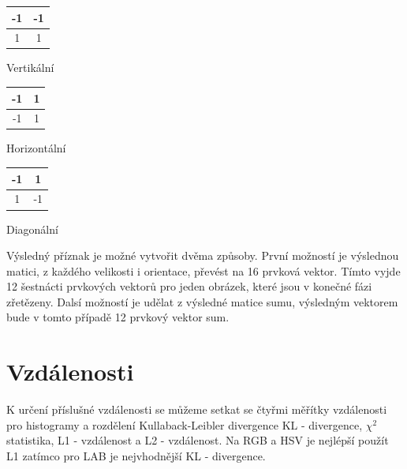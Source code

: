 \documentclass[czech,BP]{thesiskiv}
\begin{document}

\begin{multicols}{3}
	\begin{center}
		\begin{tabular}{ | c | c | }
    		\hline
    		\cellcolor{ashgrey!50}-1 & \cellcolor{ashgrey!50}-1 \\ \hline
    		1 & 1 \\ 
    		\hline
    	\end{tabular}
    	\vspace{0.5cm}
    	\par Vertikální
	\end{center}
	\begin{center}
		\begin{tabular}{ | c | c | }
    		\hline
    		\cellcolor{ashgrey!50}-1 & 1 \\ \hline
    		\cellcolor{ashgrey!50}-1 & 1 \\ 
    		\hline
    	\end{tabular}
		\vspace{0.5cm}
    	\par Horizontální
	\end{center} 	
	\begin{center}
		\begin{tabular}{ | c | c | }
    		\hline
    		\cellcolor{ashgrey!50}-1 & 1 \\ \hline
    		1 & \cellcolor{ashgrey!50}-1 \\ 
    		\hline
    	\end{tabular}
		\vspace{0.5cm}
    	\par Diagonální
	\end{center} 	
\end{multicols}

Výsledný příznak je možné vytvořit dvěma způsoby. První možností je výslednou matici, z každého velikosti i orientace, převést na 16 prvková vektor. Tímto vyjde 12 šestnácti prvkových vektorů pro jeden obrázek, které jsou v konečné fázi zřetězeny. Dalsí možností je udělat z výsledné matice sumu, výsledným vektorem bude v tomto případě 12 prvkový vektor sum. 

\section{Vzdálenosti}
\par K určení příslušné vzdálenosti se můžeme setkat se čtyřmi měřítky vzdálenosti pro histogramy a rozdělení Kullaback-Leibler divergence KL - divergence, $\chi^2$ statistika, L1 - vzdálenost a L2 - vzdálenost. Na RGB a HSV je nejlépší použít L1 zatímco pro LAB je nejvhodnější KL - divergence. 
\end{document}
